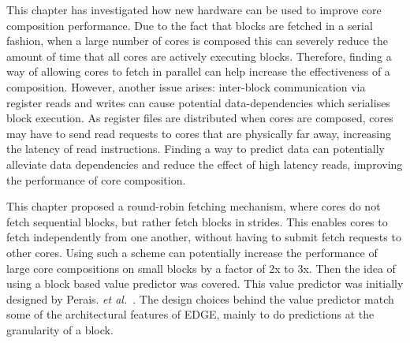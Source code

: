 This chapter has investigated how new hardware can be used to improve core composition performance.
Due to the fact that blocks are fetched in a serial fashion, when a large number of cores is composed this can severely reduce the amount of time that all cores are actively executing blocks.
Therefore, finding a way of allowing cores to fetch in parallel can help increase the effectiveness of a composition.
However, another issue arises: inter-block communication via register reads and writes can cause potential data-dependencies which serialises block execution.
As register files are distributed when cores are composed, cores may have to send read requests to cores that are physically far away, increasing the latency of read instructions.
Finding a way to predict data can potentially alleviate data dependencies and reduce the effect of high latency reads, improving the performance of core composition.

This chapter proposed a round-robin fetching mechanism, where cores do not fetch sequential blocks, but rather fetch blocks in strides.
This enables cores to fetch independently from one another, without having to submit fetch requests to other cores.
Using such a scheme can potentially increase the performance of large core compositions on small blocks by a factor of 2x to 3x.
Then the idea of using a block based value predictor was covered.
This value predictor was initially designed by Perais. {\it et al.}~\cite{peraisVTAGE2014, peraisBeBop2015}.
The design choices behind the value predictor match some of the architectural features of EDGE, mainly to do predictions at the granularity of a block.

